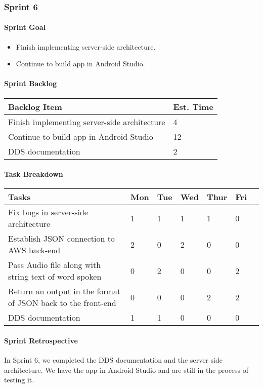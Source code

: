 \subsubsection{Sprint 6}

\paragraph{Sprint Goal}
\begin{itemize}
    \item  Finish implementing server-side architecture.
    \item  Continue to build app in Android Studio.
\end{itemize}

\paragraph{Sprint Backlog}
\begin{table}[htbp]
    \centering
    \begin{tabularx}{\textwidth}{l|l}
        Backlog Item & Est. Time\\
        \hline
        Finish implementing server-side architecture & 4\\
        Continue to build app in Android Studio & 12\\
        DDS documentation & 2\\
    \end{tabularx}
\end{table}

\paragraph{Task Breakdown}
\begin{tabular}[htbp]
    \centering
    \begin{tabularx}{\textwidth}{l|l|l|l|l|l|l}
        Tasks &    Mon & Tue & Wed & Thur & Fri\\
        \hline
        Fix bugs in server-side architecture & 1 & 1 & 1 & 1 & 0\\
        Establish JSON connection to AWS back-end & 2 & 0 & 2 & 0 & 0\\
        Pass Audio file along with string text of word spoken & 0 & 2 & 0 & 0 & 2\\
        Return an output in the format of JSON back to the front-end & 0 & 0 & 0 & 2 & 2\\
        DDS documentation & 1 & 1 & 0 & 0 & 0\\
    \end{tabularx}
\end{tabular}

\paragraph{Sprint Retrospective}
In Sprint 6, we completed the DDS documentation and the server side architecture. We have the app in Android Studio and are still in the process of testing it.
